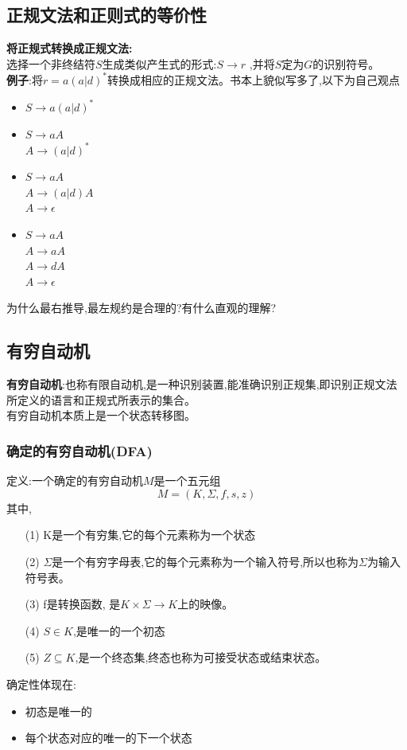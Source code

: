   \subsection{正规文法和正则式的等价性}
  \textbf{将正规式转换成正规文法:}\\
  选择一个非终结符$S$生成类似产生式的形式:$S\to r$ ,并将$S$定为$G$的识别符号。\\

  \textbf{例子}:将$r = a(a|d)^*$转换成相应的正规文法。{\color{red}书本上貌似写多了,以下为自己观点}
  \begin{itemize}
    \item
    $S\to a(a|d)^*$
    \item
    $S\to aA$\\
    $A \to (a|d)^*$
    \item
    $S \to aA$\\
    $A \to (a|d)A$  \\
    $A \to \epsilon$
    \item
    $S \to aA$\\
    $A \to aA$\\
    $A \to dA$\\
    $A \to \epsilon$
  \end{itemize}

  {\color{red}为什么最右推导,最左规约是合理的?有什么直观的理解?}

  \subsection{有穷自动机}
  \textbf{有穷自动机}:也称有限自动机,是一种识别装置,能准确识别正规集,即识别正规文法所定义的语言和正规式所表示的集合。\\
  有穷自动机本质上是一个状态转移图。

  \spaceline
  \subsubsection{确定的有穷自动机(DFA)}
  定义:一个确定的有穷自动机$M$是一个五元组
  \[M = (K , \Sigma , f , s , z)\]
  其中,
  \begin{itemize}
    \item [(1)] K是一个有穷集,它的每个元素称为一个状态
    \item [(2)] $\Sigma$是一个有穷字母表,它的每个元素称为一个输入符号,所以也称为$\Sigma$为输入符号表。
    \item [(3)] f是转换函数, 是$K\times \Sigma \to K$上的映像。
    \item [(4)] $S\in K$,是唯一的一个初态
    \item [(5)] $Z \subseteq  K$,是一个终态集,终态也称为可接受状态或结束状态。
  \end{itemize}
  确定性体现在:
  \begin{itemize}
    \item 初态是唯一的
    \item 每个状态对应的唯一的下一个状态
  \end{itemize}

